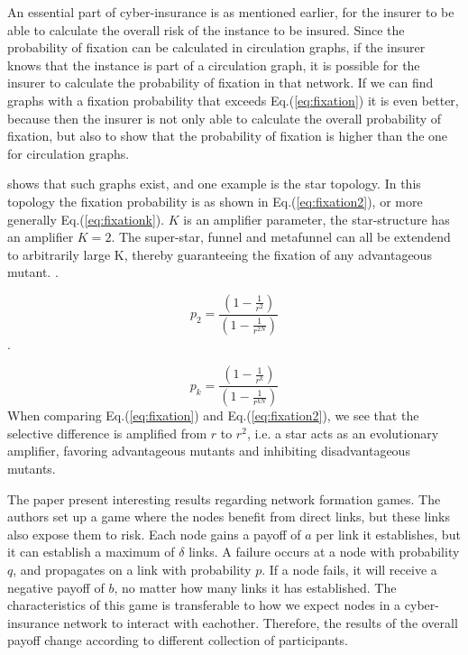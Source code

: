 An essential part of cyber-insurance is as mentioned earlier, for the insurer to be able to calculate the overall risk of the instance to be insured. Since the probability of fixation can be calculated in circulation graphs, if the insurer knows that the instance is part of a circulation graph, it is possible for the insurer to calculate the probability of fixation in that network. 
If we can find graphs with a fixation probability that exceeds Eq.(\ref{eq:fixation}) it is even better, because then the insurer is not only able to calculate the overall probability of fixation, but also to show that the probability of fixation is higher than the one for circulation graphs.

\cite{lieberman2005evolutionary} shows that such graphs exist, and one example is the star topology.
In this topology the fixation probability is as shown in Eq.(\ref{eq:fixation2}), or more generally Eq.(\ref{eq:fixationk}). $K$ is an amplifier parameter, the star-structure has an amplifier $K=2$. The super-star, funnel and metafunnel can all be extendend to arbitrarily large K, thereby guaranteeing the fixation of any advantageous mutant. \cite{lieberman2005evolutionary}.

\begin{equation}p_{2}=\frac{(1-\frac{1}{r^{2}})}{(1-\frac{1}{r^{2N}})} \label{eq:fixation2} \end{equation}.

\begin{equation}
p_{k}=\frac{(1-\frac{1}{r^{k}})}{(1-\frac{1}{r^{kN}})} \label{eq:fixationk}
\end{equation}
 When comparing Eq.(\ref{eq:fixation}) and Eq.(\ref{eq:fixation2}), we see that the selective difference is
 amplified from $r$ to $r^{2}$, i.e. a star acts as an evolutionary amplifier, favoring advantageous
  mutants and inhibiting disadvantageous mutants.

The paper \cite{contagion} present interesting results regarding network formation games. 
The authors set up a game where the nodes benefit from direct links, but these links also expose them to risk. 
Each node gains a payoff of $a$ per link it establishes, but it can establish a maximum of $\delta$ links.
A failure occurs at a node with probability $q$, and propagates on a link with probability $p$. If a node fails, it will receive a negative payoff of $b$, no matter how many links it has established. The characteristics of this game is transferable to how we expect nodes in a cyber-insurance network to interact with eachother. Therefore, the results of the overall payoff change according to different collection of participants. 

